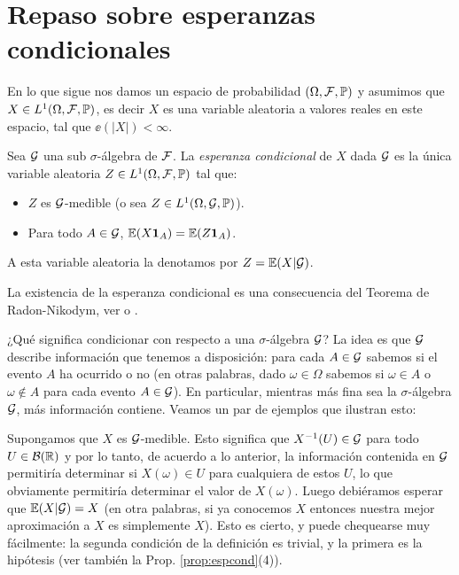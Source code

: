 
\section{Repaso sobre esperanzas condicionales}\label{sec:espCond}

En lo que sigue nos damos un espacio de probabilidad $(\Omega,\mathcal{F},\mathbb{P})$ y asumimos que $X\in L^1(\Omega,\mathcal{F},\mathbb{P})$, es decir $X$ es una variable aleatoria a valores reales en este espacio, tal que $\ee(|X|)<\infty$.

\begin{defn}
Sea $\mathcal{G}$ una sub $\sigma$-álgebra de $\mathcal{F}$.
La \emph{esperanza condicional} de $X$ dada $\mathcal{G}$ es la única variable aleatoria $Z\in L^1(\Omega,\mathcal{F},\mathbb{P})$ tal que:
\begin{itemize}
\item $Z$ es $\mathcal{G}$-medible (o sea $Z\in L^1(\Omega,\mathcal{G},\mathbb{P})$).
\item Para todo $A\in\mathcal{G}$, $\mathbb{E}(X\mathbf{1}_{A})=\mathbb{E}(Z\mathbf{1}_{A})$.
\end{itemize}
A esta variable aleatoria la denotamos por $Z=\mathbb{E}(X|\mathcal{G})$.
\end{defn}

La existencia de la esperanza condicional es una consecuencia del Teorema de Radon-Nikodym, ver \cite{medidaJSM} o \cite[Cap. 5]{durrett}.

¿Qué significa condicionar con respecto a una $\sigma$-álgebra $\mathcal{G}$?
La idea es que $\mathcal{G}$ describe información que tenemos a disposición: para cada $A\in\mathcal{G}$ sabemos si el evento $A$ ha ocurrido o no (en otras palabras, dado $\omega\in\Omega$ sabemos si $\omega\in A$ o $\omega\notin A$ para cada evento $A\in\mathcal{G}$).
En particular, mientras más fina sea la $\sigma$-álgebra $\mathcal{G}$, más información contiene.
Veamos un par de ejemplos que ilustran esto:

\begin{ex}
Supongamos que $X$ es $\mathcal{G}$-medible.
Esto significa que $X^{-1}(U)\in\mathcal{G}$ para todo $U\in\mathcal{B}(\mathbb{R})$ y por lo tanto, de acuerdo a lo anterior, la información contenida en $\mathcal{G}$ permitiría determinar si $X(\omega)\in U$ para cualquiera de estos $U$, lo que obviamente permitiría determinar el valor de $X(\omega)$.
Luego debiéramos esperar que $\mathbb{E}(X|\mathcal{G})=X$ (en otra palabras, si ya conocemos $X$ entonces nuestra mejor aproximación a $X$ es simplemente $X$).
Esto es cierto, y puede chequearse muy fácilmente: la segunda condición de la definición es trivial, y la primera es la hipótesis (ver también la Prop. \ref{prop:espcond}(4)).
\end{ex}

